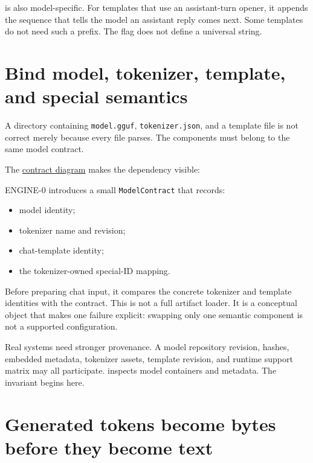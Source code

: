 \texttt{} is also model-specific. For
templates that use an assistant-turn opener, it appends the sequence
that tells the model an assistant reply comes next. Some templates do
not need such a prefix. The flag does not define a universal string.

\section{Bind model, tokenizer, template, and special
semantics}\label{bind-model-tokenizer-template-and-special-semantics}

A directory containing \texttt{model.gguf}, \texttt{tokenizer.json}, and
a template file is not correct merely because every file parses. The
components must belong to the same model contract.

The
\href{https://github.com/hermonai/inside-the-llm-engine/blob/astra-visual-rewrite/diagrams/tokenizer/model-tokenizer-template-contract.txt}{contract
diagram} makes the dependency visible:


ENGINE-0 introduces a small \texttt{ModelContract} that records:

\begin{itemize}
\tightlist
\item
  model identity;
\item
  tokenizer name and revision;
\item
  chat-template identity;
\item
  the tokenizer-owned special-ID mapping.
\end{itemize}

Before preparing chat input, it compares the concrete tokenizer and
template identities with the contract. This is not a full artifact
loader. It is a conceptual object that makes one failure explicit:
swapping only one semantic component is not a supported configuration.

Real systems need stronger provenance. A model repository revision,
hashes, embedded metadata, tokenizer assets, template revision, and
runtime support matrix may all participate.  inspects model
containers and metadata. The invariant begins here.

\section{Generated tokens become bytes before they become
text}\label{generated-tokens-become-bytes-before-they-become-text}

